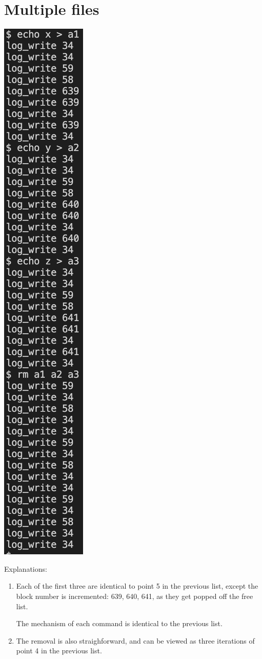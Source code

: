 \documentclass[9pt]{amsart}
\begin{document}
    \section{Multiple files}
    \includegraphics[scale = 0.5]{p2_out.png}

    Explanations:
    \begin{enumerate}
        \item Each of the first three are identical to point 5 in the previous list, except the block number is incremented: 639, 640, 641, as they get popped off the free list.
        
        The mechanism of each command is identical to the previous list.
        \item The removal is also straighforward, and can be viewed as three iterations of point 4 in the previous list. 
    \end{enumerate}
\end{document}
